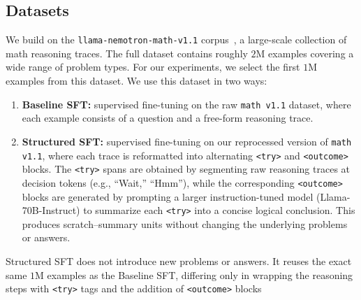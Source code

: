 \documentclass{article}
\begin{document}
\subsection{Datasets}
We build on the \texttt{llama-nemotron-math-v1.1} corpus~\citep{bercovich2025llama}, a large-scale collection of math reasoning traces. The full dataset contains roughly $2$M examples covering a wide range of problem types. For our experiments, we select the first $1$M examples from this dataset. We use this dataset in two ways:
\begin{enumerate}[leftmargin=*]
\item \textbf{Baseline SFT:} supervised fine-tuning on the raw \texttt{math v1.1} dataset, where each example consists of a question and a free-form reasoning trace.  


\item \textbf{Structured SFT:} supervised fine-tuning on our reprocessed version of \texttt{math v1.1}, where each trace is reformatted into alternating \texttt{<try>} and \texttt{<outcome>} blocks. The \texttt{<try>} spans are obtained by segmenting raw reasoning traces at decision tokens (e.g., “Wait,” “Hmm”), while the corresponding \texttt{<outcome>} blocks are generated by prompting a larger instruction-tuned model (Llama-70B-Instruct) to summarize each \texttt{<try>} into a concise logical conclusion. This produces scratch–summary units without changing the underlying problems or answers.
\end{enumerate}
Structured SFT does not introduce new problems or answers. It reuses the exact same $1$M examples as the Baseline SFT, differing only in wrapping the reasoning steps with \texttt{<try>} tags and the addition of \texttt{<outcome>} blocks 
\end{document}

